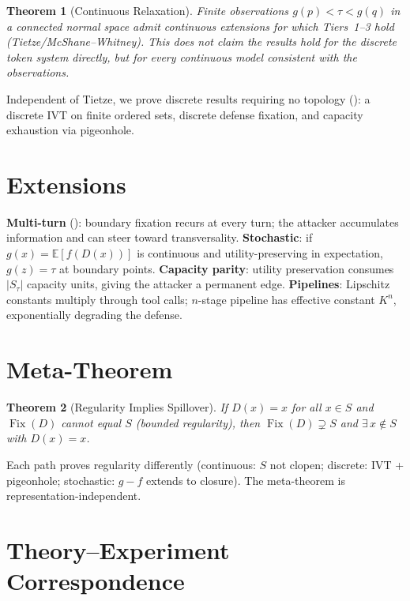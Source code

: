 \documentclass[11pt]{article}
\newtheorem{theorem}{Theorem}[section]
\newcommand{\Fix}{\operatorname{Fix}}
\begin{document}
\begin{theorem}[Continuous Relaxation]
\label{thm:tietze}
Finite observations $g(p) < \tau < g(q)$ in a connected normal space admit continuous extensions for which Tiers~1--3 hold (Tietze/McShane--Whitney). This does not claim the results hold for the discrete token system directly, but for every continuous model consistent with the observations.
\end{theorem}

Independent of Tietze, we prove discrete results requiring no topology (): a discrete IVT on finite ordered sets, discrete defense fixation, and capacity exhaustion via pigeonhole.

\section{Extensions}
\label{sec:extensions}

\textbf{Multi-turn} (): boundary fixation recurs at every turn; the attacker accumulates information and can steer toward transversality. \textbf{Stochastic}: if $g(x) = \mathbb{E}[f(D(x))]$ is continuous and utility-preserving in expectation, $g(z) = \tau$ at boundary points. \textbf{Capacity parity}: utility preservation consumes $|S_\tau|$ capacity units, giving the attacker a permanent edge. \textbf{Pipelines}: Lipschitz constants multiply through tool calls; $n$-stage pipeline has effective constant $K^n$, exponentially degrading the defense.

\section{Meta-Theorem}
\label{sec:meta}

\begin{theorem}[Regularity Implies Spillover]
\label{thm:meta}
If $D(x) = x$ for all $x \in S$ and $\Fix(D)$ cannot equal $S$ (bounded regularity), then $\Fix(D) \supsetneq S$ and $\exists\, x \notin S$ with $D(x) = x$.
\end{theorem}

Each path proves regularity differently (continuous: $S$ not clopen; discrete: IVT + pigeonhole; stochastic: $g-f$ extends to closure). The meta-theorem is representation-independent.

\section{Theory--Experiment Correspondence}
\label{sec:experiments}
\end{document}
